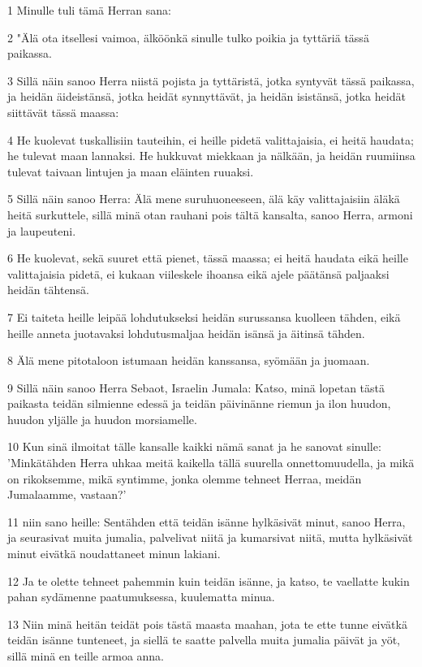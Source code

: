 \par 1 Minulle tuli tämä Herran sana:
\par 2 "Älä ota itsellesi vaimoa, älköönkä sinulle tulko poikia ja tyttäriä tässä paikassa.
\par 3 Sillä näin sanoo Herra niistä pojista ja tyttäristä, jotka syntyvät tässä paikassa, ja heidän äideistänsä, jotka heidät synnyttävät, ja heidän isistänsä, jotka heidät siittävät tässä maassa:
\par 4 He kuolevat tuskallisiin tauteihin, ei heille pidetä valittajaisia, ei heitä haudata; he tulevat maan lannaksi. He hukkuvat miekkaan ja nälkään, ja heidän ruumiinsa tulevat taivaan lintujen ja maan eläinten ruuaksi.
\par 5 Sillä näin sanoo Herra: Älä mene suruhuoneeseen, älä käy valittajaisiin äläkä heitä surkuttele, sillä minä otan rauhani pois tältä kansalta, sanoo Herra, armoni ja laupeuteni.
\par 6 He kuolevat, sekä suuret että pienet, tässä maassa; ei heitä haudata eikä heille valittajaisia pidetä, ei kukaan viileskele ihoansa eikä ajele päätänsä paljaaksi heidän tähtensä.
\par 7 Ei taiteta heille leipää lohdutukseksi heidän surussansa kuolleen tähden, eikä heille anneta juotavaksi lohdutusmaljaa heidän isänsä ja äitinsä tähden.
\par 8 Älä mene pitotaloon istumaan heidän kanssansa, syömään ja juomaan.
\par 9 Sillä näin sanoo Herra Sebaot, Israelin Jumala: Katso, minä lopetan tästä paikasta teidän silmienne edessä ja teidän päivinänne riemun ja ilon huudon, huudon yljälle ja huudon morsiamelle.
\par 10 Kun sinä ilmoitat tälle kansalle kaikki nämä sanat ja he sanovat sinulle: 'Minkätähden Herra uhkaa meitä kaikella tällä suurella onnettomuudella, ja mikä on rikoksemme, mikä syntimme, jonka olemme tehneet Herraa, meidän Jumalaamme, vastaan?'
\par 11 niin sano heille: Sentähden että teidän isänne hylkäsivät minut, sanoo Herra, ja seurasivat muita jumalia, palvelivat niitä ja kumarsivat niitä, mutta hylkäsivät minut eivätkä noudattaneet minun lakiani.
\par 12 Ja te olette tehneet pahemmin kuin teidän isänne, ja katso, te vaellatte kukin pahan sydämenne paatumuksessa, kuulematta minua.
\par 13 Niin minä heitän teidät pois tästä maasta maahan, jota te ette tunne eivätkä teidän isänne tunteneet, ja siellä te saatte palvella muita jumalia päivät ja yöt, sillä minä en teille armoa anna.
